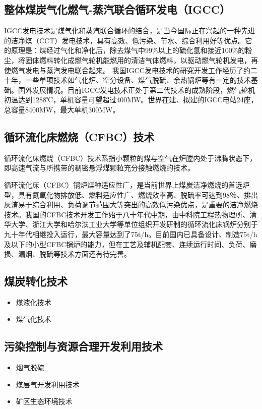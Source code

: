 \documentclass[10pt,openany]{ctexbook}
\begin{document}
\subsection{整体煤炭气化燃气-蒸汽联合循环发电（IGCC）}
IGCC发电技术是煤气化和蒸汽联合循环的结合，是当今国际正在兴起的一种先进的洁净煤（CCT）发电技术，具有高效、低污染、节水、综合利用好等优点。它的原理是：煤经过气化和净化后，除去煤气中99\%以上的硫化氢和接近100\%的粉尘，将固体燃料转化成燃气轮机能燃用的清洁气体燃料，以驱动燃气轮机发电，再使燃气发电与蒸汽发电联合起来。
我国IGCC发电技术的研究开发工作经历了约二十年，一些单项技术如气化炉、空分设备、煤气脱硫、余热锅炉等有一定的技术基础。国外发展情况。目前IGCC发电技术正处于第二代技术的成熟阶段，燃气轮机初温达到1288℃，单机容量可望超过400MW。世界在建、拟建的IGCC电站24座，总容量8400MW，最大单机300MW。
\subsection{循环流化床燃烧（CFBC）技术}
循环流化床燃烧（CFBC）技术系指小颗粒的煤与空气在炉膛内处于沸腾状态下，即高速气流与所携带的稠密悬浮煤颗粒充分接触燃烧的技术。\par
循环流化床（CFBC）锅炉煤种适应性广，是当前世界上煤炭洁净燃烧的首选炉型，具有氮氧化物排放低、燃料适应性广、燃烧效率高、脱硫率可达到98％、排出灰渣易于综合利用、负荷调节范围大等突出的高效低污染优点，是重要的洁净燃烧技术。我国的CFBC技术开发工作始于八十年代中期，由中科院工程热物理所、清华大学、浙江大学和哈尔滨工业大学等单位组织开发研制的循环流化床锅炉分别于九十年代相继投入运行，最大容量达到了75t/h。目前国内已具备设计、制造75t/h及以下的小型CFBC锅炉的能力，但在工艺及辅机配套、连续运行时间、负荷、磨损、漏烟、脱硫等技术方面还有待完善。
\subsection{煤炭转化技术}
\begin{itemize}
\item 煤液化技术
\item 煤气化技术
\end{itemize}
\subsection{污染控制与资源合理开发利用技术}
\begin{itemize}
\item 烟气脱硫
\item 煤层气开发利用技术
\item 矿区生态环境技术
\end{itemize}
\end{document}
